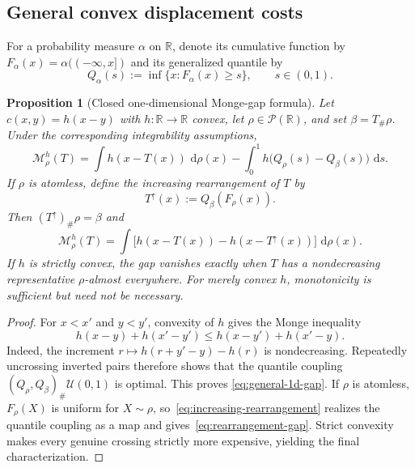 \documentclass[11pt,a4paper]{article}
\newtheorem{proposition}[theorem]{Proposition}
\theoremstyle{definition}
\theoremstyle{remark}
\newcommand{\R}{\mathbb R}
\newcommand{\Pcal}{\mathcal P}
\newcommand{\Mcal}{\mathcal M}
\newcommand{\dd}{\,\mathrm d}
\begin{document}
\subsection{General convex displacement costs}

For a probability measure $\alpha$ on $\R$, denote its cumulative function by
$F_\alpha(x)=\alpha(( -\infty,x])$ and its generalized quantile by
\[
  Q_\alpha(s):=\inf\{x:F_\alpha(x)\geq s\},\qquad s\in(0,1).
\]

\begin{proposition}[Closed one-dimensional Monge-gap formula]
\label{prop:one-dimensional-gap}
Let $c(x,y)=h(x-y)$ with $h:\R\to\R$ convex, let $\rho\in\Pcal(\R)$, and set
$\beta=T_\#\rho$. Under the corresponding integrability assumptions,
\begin{equation}\label{eq:general-1d-gap}
  \Mcal_\rho^h(T)
  =\int h(x-T(x))\,\dd\rho(x)
   -\int_0^1 h\bigl(Q_\rho(s)-Q_\beta(s)\bigr)\,\dd s.
\end{equation}
If $\rho$ is atomless, define the increasing rearrangement of $T$ by
\begin{equation}\label{eq:increasing-rearrangement}
  T^\uparrow(x):=Q_\beta(F_\rho(x)).
\end{equation}
Then $(T^\uparrow)_\#\rho=\beta$ and
\begin{equation}\label{eq:rearrangement-gap}
  \Mcal_\rho^h(T)
  =\int\bigl[h(x-T(x))-h(x-T^\uparrow(x))\bigr]\,\dd\rho(x).
\end{equation}
If $h$ is strictly convex, the gap vanishes exactly when $T$ has a
nondecreasing representative $\rho$-almost everywhere. For merely convex
$h$, monotonicity is sufficient but need not be necessary.
\end{proposition}

\begin{proof}
For $x<x'$ and $y<y'$, convexity of $h$ gives the Monge inequality
\[
  h(x-y)+h(x'-y')\leq h(x-y')+h(x'-y).
\]
Indeed, the increment $r\mapsto h(r+y'-y)-h(r)$ is nondecreasing. Repeatedly
uncrossing inverted pairs therefore shows that the quantile coupling
$(Q_\rho,Q_\beta)_\#\mathcal U(0,1)$ is optimal. This proves
\eqref{eq:general-1d-gap}. If $\rho$ is atomless, $F_\rho(X)$ is uniform for
$X\sim\rho$, so~\eqref{eq:increasing-rearrangement} realizes the quantile
coupling as a map and gives~\eqref{eq:rearrangement-gap}. Strict convexity
makes every genuine crossing strictly more expensive, yielding the final
characterization.
\end{proof}
\end{document}
